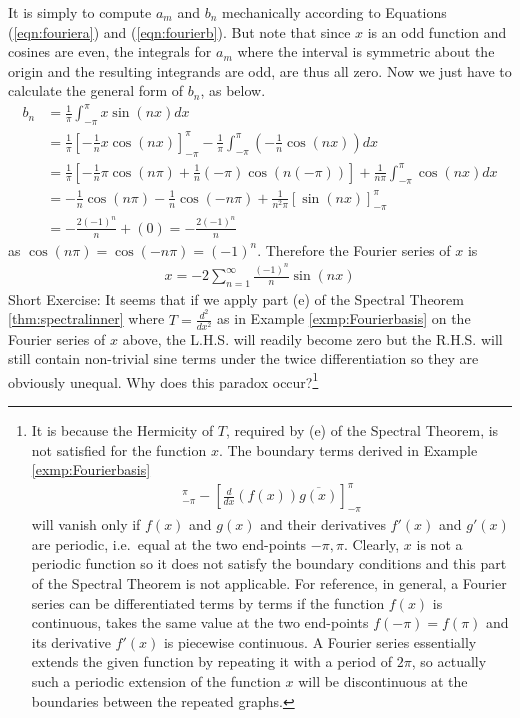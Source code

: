 \begin{solution}
It is simply to compute $a_m$ and $b_n$ mechanically according to Equations (\ref{eqn:fouriera}) and (\ref{eqn:fourierb}). But note that since $x$ is an odd function and cosines are even, the integrals for $a_m$ where the interval is symmetric about the origin and the resulting integrands are odd, are thus all zero. Now we just have to calculate the general form of $b_n$, as below.
\begin{align*}
b_n &= \frac{1}{\pi} \int_{-\pi}^{\pi} x\sin(nx) dx \\
&= \frac{1}{\pi}[-\frac{1}{n}x\cos(nx)]_{-\pi}^{\pi} - \frac{1}{\pi}\int_{-\pi}^{\pi} (-\frac{1}{n}\cos(nx)) dx \\
&= \frac{1}{\pi}[-\frac{1}{n}\pi\cos(n\pi) + \frac{1}{n}(-\pi)\cos(n(-\pi))] + \frac{1}{n\pi}\int_{-\pi}^{\pi} \cos(nx) dx \\
&= -\frac{1}{n}\cos(n\pi) - \frac{1}{n}\cos(-n\pi) + \frac{1}{n^2\pi}[\sin(nx)]_{-\pi}^{\pi} \\
&= -\frac{2(-1)^n}{n} + (0) = -\frac{2(-1)^n}{n}
\end{align*}
as $\cos(n\pi) = \cos(-n\pi) = (-1)^n$. Therefore the Fourier series of $x$ is
\begin{align*}
x = -2 \sum_{n=1}^{\infty} \frac{(-1)^n}{n} \sin(nx)
\end{align*}
Short Exercise: It seems that if we apply part (e) of the Spectral Theorem \ref{thm:spectralinner} where $T = \frac{d^2}{dx^2}$ as in Example \ref{exmp:Fourierbasis} on the Fourier series of $x$ above, the L.H.S. will readily become zero but the R.H.S. will still contain non-trivial sine terms under the twice differentiation so they are obviously unequal. Why does this paradox occur?\footnote{\label{foot:fourier}It is because the Hermicity of $T$, required by (e) of the Spectral Theorem, is not satisfied for the function $x$. The boundary terms derived in Example \ref{exmp:Fourierbasis}
\begin{align*}
[f(x) \frac{d}{dx}\overline{([g(x)])}]_{-\pi}^\pi - [\frac{d}{dx}(f(x)) \overline{g(x)}]_{-\pi}^\pi    
\end{align*}
will vanish only if $f(x)$ and $g(x)$ and their derivatives $f'(x)$ and $g'(x)$ are periodic, i.e.\ equal at the two end-points $-\pi, \pi$. Clearly, $x$ is not a periodic function so it does not satisfy the boundary conditions and this part of the Spectral Theorem is not applicable. For reference, in general, a Fourier series can be differentiated terms by terms if the function $f(x)$ is continuous, takes the same value at the two end-points $f(-\pi) = f(\pi)$ and its derivative $f'(x)$ is piecewise continuous. A Fourier series essentially extends the given function by repeating it with a period of $2\pi$, so actually such a periodic extension of the function $x$ will be discontinuous at the boundaries between the repeated graphs.}
\end{solution}

